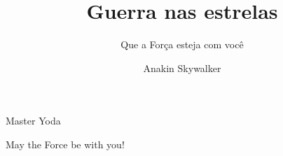 \documentclass[oneside, 12pt]{ifgw}
\author{Anakin Skywalker}
\institute[Darth Plagueis Institute]{Instituto Darth Plagueis}
\title[Star Wars]{Guerra nas estrelas}
\subtitle[May the Force be with you]{Que a Força esteja com você}
\begin{document}
\maketitle
\makebackcover




\dedication{To my son, Luke Skywalker.}
\epigraph{Master Yoda}{May the Force be with you!}





\listoffigures
\listoftables
\tableofcontents











\appendix



\end{document}
